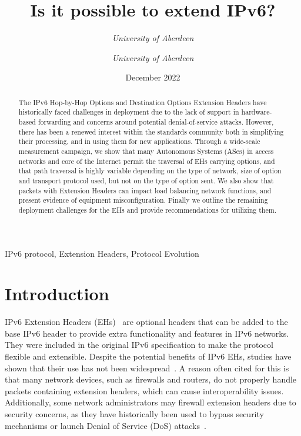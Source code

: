 \documentclass[conference]{IEEEtran}
\title{Is it possible to extend IPv6?}
\date{December 2022}
\author{\IEEEauthorblockN{Ana Custura}
\IEEEauthorblockA{
\textit{University of Aberdeen}\\
}
\and
\IEEEauthorblockN{Raffaello Secchi}
\textit{University of Aberdeen}\\
\and
\IEEEauthorblockN{Gorry Fairhurst}
\textit{University of Aberdeen}\\
}
\begin{document}
\maketitle

\begin{abstract}
The IPv6 Hop-by-Hop Options and Destination Options Extension Headers have historically faced challenges in deployment due to the lack of support in hardware-based forwarding and concerns around potential denial-of-service attacks. However, there has been a renewed interest within the standards community both in simplifying their processing, and in using them for new applications. 
Through a wide-scale measurement campaign, we show that many Autonomous Systems (ASes) in access networks and core of the Internet permit the traversal of EHs carrying options, and that path traversal is highly variable depending on the type of network, size of option and transport protocol used, but not on the type of option sent. We also show that packets with Extension Headers can impact load balancing network functions, and present evidence of equipment misconfiguration. Finally we outline the remaining deployment challenges for the EHs and provide recommendations for utilizing them.

\end{abstract}

\begin{IEEEkeywords}
IPv6 protocol, Extension Headers, Protocol Evolution
\end{IEEEkeywords}

\section{Introduction}
\label{sec:introduction}

IPv6 Extension Headers (EHs)~\cite{RFC8200} are optional headers that can be 
added to the base IPv6 header to provide extra functionality and features in
IPv6 networks. They were included in the original IPv6 specification
to make the protocol flexible and extensible.
Despite the potential benefits of IPv6 EHs, studies have shown that their use
has not been widespread~\cite{rfc9098}. A reason often cited for this is that many
network devices, such as firewalls and routers, do not properly handle packets
containing extension headers, which can cause interoperability issues.
Additionally, some network administrators may firewall extension
headers due to security concerns, as they have historically been used to bypass
security mechanisms or launch Denial of Service (DoS) attacks~\cite{naagas2021deh}.
\end{document}

